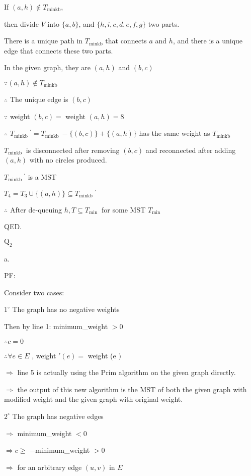 \documentclass[12pt]{article}
\begin{document}
If $(a, h) \not\in T_{\text {minkb}}$, 

then divide $V$ into $\{a ,b\}$, and $\{h, i, c, d, e, f, g\}$ two parts.

There is a unique path in $T_{\text {minkb}}$ that connects $a$ and $h$, and there is a unique edge that connects these two parts. 

In the given graph, they are $(a,h)$ and $(b,c)$

$\because(a, h) \notin T_{\text {minkb }} $

$\therefore$ The unique edge is $(b, c)$

$\because$ weight $(b,c)=$ weight $(a,h)=8$

$\therefore$  $T_{\text {minkb }}{}^{\prime}=T_{\text {minkb }}-\{(b, c)\}+\{(a , h)\}$ has the same weight as $T_{\text {minkb }}$

$T_{\text {minkb }}$ is disconnected after removing $(b,c)$ and reconnected after adding $(a, h)$ with no circles produced.

$T_{\text {minkb }}{}^{\prime}$ is a MST

$T_4=T_3 \cup\{(a, h)\} \subseteq T_{\text {minkb }}{}^{\prime}$

$\therefore$ After de-queuing $h, T\subseteq T_{\text {min }}$  for some MST $T_{\text {min }}$

QED.

\newpage
$\text{Q}_{2}$

a.

PF:

Consider two cases:

$1^{\circ}$ The graph has no negative weights

Then by line 1: minimum\_weight $>0$

$\therefore c=0$

$\therefore \forall e\in E$ , weight $'(e)=$ weight (e $)$

$\Rightarrow$ line 5 is actually using the Prim algorithm on the given graph directly.

$\Rightarrow$ the output of this new algorithm is the MST of both the given graph with modified weight and the given graph with original weight.

$2^{\circ}$ The graph has negative edges

$\Rightarrow$ minimum\_weight $<0$

$\Rightarrow c \geq$ $-$minimum\_weight $>0$

$\Rightarrow$ for an arbitrary edge $(u,v)$ in $E$
\end{document}
